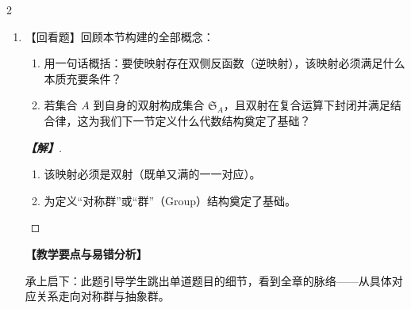 \documentclass[12pt]{ctexart}
\newenvironment{solution}[1][解]{%
    \par\begingroup\color{blue!85!black}%
    \begin{proof}[\indent\bfseries\color{blue!85!black}【#1】]%
  }{%
    \end{proof}\endgroup\par
  }
\newenvironment{teacherNote}[1][教学要点与易错分析]{%
    \par\vspace{0.6ex}%
    \begingroup\color{teal!80!black}\small
    \noindent\textbf{【#1】}\par\vspace{0.2ex}%
  }{%
    \endgroup\par\vspace{0.6ex}%
  }
\newcommand{\ansspace}[1]{\par\vspace{0.4ex}}
\newcommand{\ansspace}[1]{\vspace{#1}}
\begin{document}
\begin{multicols}{2}
\begin{enumerate}[resume=probchain]
\item 【回看题】回顾本节构建的全部概念：
\begin{enumerate}
  \item 用一句话概括：要使映射存在双侧反函数（逆映射），该映射必须满足什么本质充要条件？
  \item 若集合 $A$ 到自身的双射构成集合 $\mathfrak{S}_A$，且双射在复合运算下封闭并满足结合律，这为我们下一节定义什么代数结构奠定了基础？
\end{enumerate}
\ansspace{4.0cm}
\begin{solution}
\begin{enumerate}
  \item 该映射必须是双射（既单又满的一一对应）。
  \item 为定义“对称群”或“群”（Group）结构奠定了基础。
\end{enumerate}
\end{solution}
\begin{teacherNote}
承上启下：此题引导学生跳出单道题目的细节，看到全章的脉络——从具体对应关系走向对称群与抽象群。
\end{teacherNote}

\end{enumerate}

\end{multicols}

\label{LastPage}
\end{document}
